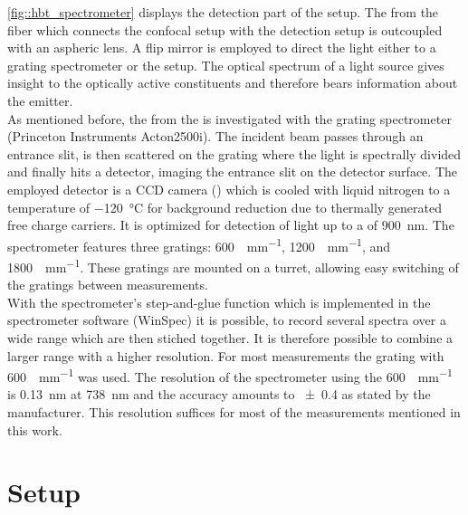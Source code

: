 		\autoref{fig::hbt_spectrometer} displays the detection part of the setup.
		The \fl from the fiber which connects the confocal setup with the detection setup is outcoupled with an aspheric lens.
		A flip mirror is employed to direct the light either to a grating spectrometer or the \hbt setup.
		The optical spectrum of a light source gives insight to the optically active constituents and therefore bears information about the emitter.
		\\
		As mentioned before, the \fl from the \sivs is investigated with the grating spectrometer (Princeton Instruments Acton2500i).
		The incident beam passes through an entrance slit, is then scattered on the grating where the light is spectrally divided and finally hits a detector, imaging the entrance slit on the detector surface.
		The employed detector is a CCD camera () which is cooled with liquid nitrogen to a temperature of \SI{-120}{\celsius} for background reduction due to thermally generated free charge carriers.
		It is optimized for detection of light up to a \wl of \SI{900}{nm}.
		The spectrometer features three gratings: \SI[per-mode=symbol]{600}{\lines\per\mm}, \SI[per-mode=symbol]{1200}{\lines\per\mm}, and \SI[per-mode=symbol]{1800}{\lines\per\mm}.
		These gratings are mounted on a turret, allowing easy switching of the gratings between measurements.
		\\
		With the spectrometer's step-and-glue function which is implemented in the spectrometer software (WinSpec) it is possible, to record several spectra over a wide \wl range which are then stiched together.
		It is therefore possible to combine a larger \wl range with a higher resolution.
		For most measurements the grating with \SI[per-mode=symbol]{600}{\lines\per\mm} was used.
		The resolution of the spectrometer using the \SI{600}{\lines\per\mm} is \SI{0.13}{nm} at \SI{738}{nm} and the accuracy amounts to \num{\pm0.4} as stated by the manufacturer.
		This resolution suffices for most of the measurements mentioned in this work.

	\section[HBT]{\HBT Setup}\label{sec::methods_hbt}


